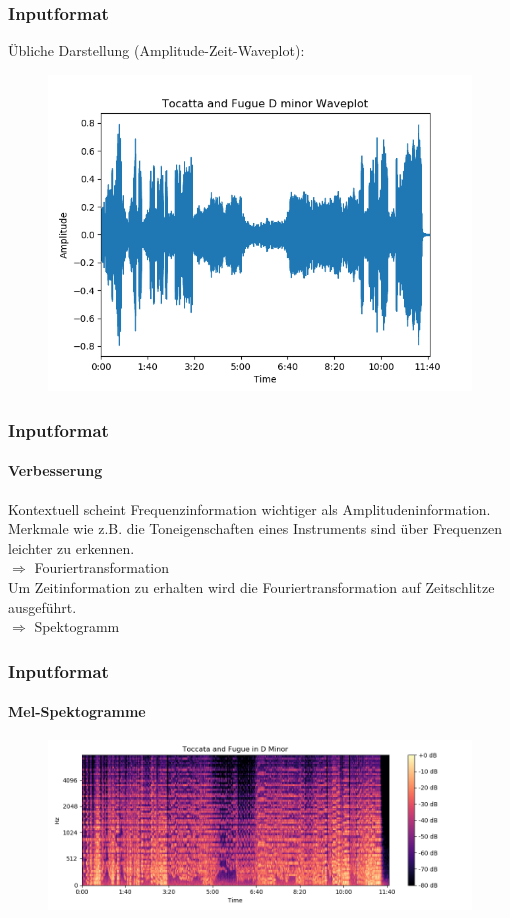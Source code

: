 \documentclass{beamer}
\begin{document}
\frame
{
	\frametitle{Inputformat}
	Übliche Darstellung (Amplitude-Zeit-Waveplot):
	\begin{figure}[h!]
		\centering
		\includegraphics[width=0.8\linewidth,height=0.8\textheight, keepaspectratio]{res/old/tocattaandfuguewaveplot.png}
	\end{figure}
}

\frame
{
	\frametitle{Inputformat}
	\framesubtitle{Verbesserung}
	Kontextuell scheint Frequenzinformation wichtiger als Amplitudeninformation.\\
	Merkmale wie z.B. die Toneigenschaften eines Instruments sind über Frequenzen leichter zu erkennen.\\
	$\Rightarrow$ Fouriertransformation\\
	Um Zeitinformation zu erhalten wird die Fouriertransformation auf Zeitschlitze ausgeführt.\\
	$\Rightarrow$ Spektogramm
}

\frame
{
	\frametitle{Inputformat}
	\framesubtitle{Mel-Spektogramme}
	\begin{figure}[h!]
		\centering
		\includegraphics[width=\linewidth,height=\textheight, keepaspectratio]{res/old/tocattaandfuguemelspectogram.png}
	\end{figure}
}
\end{document}
